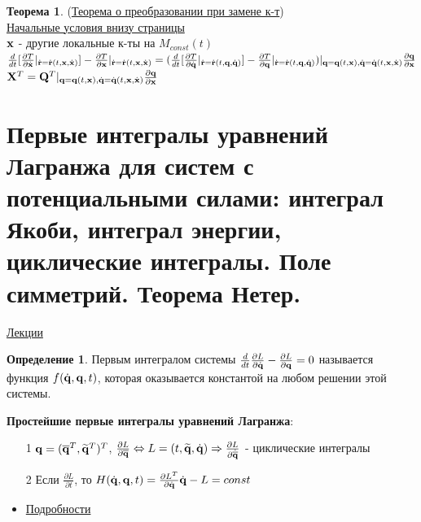 \documentclass[specialist, subf, href, colorlinks=true, 12pt, times, mtpro, final]{disser}
\theoremstyle{definition}
\newtheorem{defn}{Определение}[section]
\newtheorem{theorem}{Теорема}[section]
\begin{document}
	\begin{theorem}(\hyperlink {first_lects.31}{Теорема о преобразовании при замене к-т})\\
	
	\noindent\hyperlink {first_lects.31}{Начальные условия внизу страницы}\\
	
	$\mathbf{x}$ - другие локальные к-ты на $M_{const} (t)$\\
	$\frac{d}{dt}[\frac{\partial T}{\partial \dot{\mathbf{x}}}|_{\dot{\mathbf{r}} = \dot{\mathbf{r}}(t, \mathbf{x}, \dot{\mathbf{x}})}]  -  \frac{\partial T}{\partial \mathbf{x}}|_{\dot{\mathbf{r}} = \dot{\mathbf{r}}(t, \mathbf{x}, \dot{\mathbf{x}})} = 
	(\frac{d}{dt}[\frac{\partial T}{\partial \dot{\mathbf{q}}}|_{\dot{\mathbf{r}} = \dot{\mathbf{r}}(t, \mathbf{q}, \dot{\mathbf{q}})}]  -  \frac{\partial T}{\partial \mathbf{q}}|_{\dot{\mathbf{r}} = \dot{\mathbf{r}}(t, \mathbf{q}, \dot{\mathbf{q}})})|_{\mathbf{q} = \mathbf{q}(t, \mathbf{x}), \dot{\mathbf{q}} = \dot{\mathbf{q}} (t, \mathbf{x}, \dot{\mathbf{x}})} \frac{\partial \mathbf{q}}{\partial \mathbf{x}}$\\
	$\mathbf{X}^T =  \mathbf{Q}^T |_{\mathbf{q} = \mathbf{q}(t, \mathbf{x}), \dot{\mathbf{q}} = \dot{\mathbf{q}} (t, \mathbf{x}, \dot{\mathbf{x}})} \frac{\partial \mathbf{q}}{\partial \mathbf{x}}$ 
	\end{theorem}
	
	
     
    
    \section{Первые интегралы уравнений Лагранжа для систем с потенциальными силами:    интеграл Якоби, интеграл энергии, циклические интегралы. Поле симметрий. Теорема Нетер.}
     \label{8}
    \hyperlink {lects.1}{Лекции} \\
    \begin{defn}
	Первым интегралом системы $\frac{d}{dt}\frac{\partial L}{\partial \dot{\mathbf{q}}} - \frac{\partial L}{\partial \mathbf{q}} = 0$ называется функция $f(\dot{\mathbf{q}}, \mathbf{q}, t)$, которая оказывается константой на любом решении этой системы.   
    \end{defn}
    
    \textbf{Простейшие первые интегралы уравнений Лагранжа}:
    \begin{itemize}
    \item[1] $\mathbf{q} = (\overline{\mathbf{q}}^T, \widetilde{\mathbf{q}}^T)^T$, $\frac{\partial L}{\partial \overline{\mathbf{q}}} \Leftrightarrow L=(t, \widetilde{\mathbf{q}}, \dot{\mathbf{q}}) \Rightarrow \frac{\partial L}{\partial \dot{\overline{\mathbf{q}}}}$ - циклические интегралы
    \item[2] Если $\frac{\partial L}{\partial t}$, то $H(\dot{\mathbf{q}}, \mathbf{q}, t) = \frac{\partial L^T}{\partial \dot{\mathbf{q}}} \dot{\mathbf{q}} - L = const$
    \item \hyperlink {lects.1}{Подробности} 
    \end{itemize}
    
\end{document}
